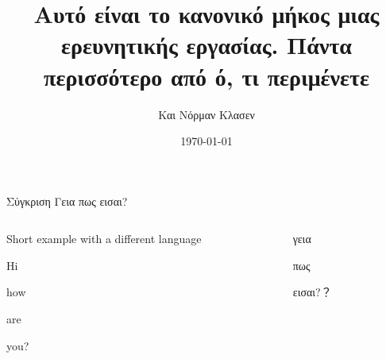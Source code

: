 \documentclass[aspectratio=169]{beamer}
\title[σύντομος τίτλος]{Αυτό είναι το κανονικό μήκος μιας ερευνητικής εργασίας.
Πάντα περισσότερο από ό, τι περιμένετε}
\institute{ινστιτούτο}
\author{Και Νόρμαν Κλασεν}
\date{\today}
\begin{document}
\maketitle

\begin{frame}{Σύγκριση}
  Γεια πως εισαι?

  \begin{columns}[T]
    \begin{column}{.49\linewidth}
      \begin{vfilleditems}
        \item Short example with a different language
        \item Hi
        \item how
        \item are
        \item you?
      \end{vfilleditems}
    \end{column}
    \begin{column}{.49\linewidth}

      \begin{vfilleditems}
        \item γεια
        \item πως
        \item εισαι?？
      \end{vfilleditems}
    \end{column}
  \end{columns}
\end{frame}
\end{document}
